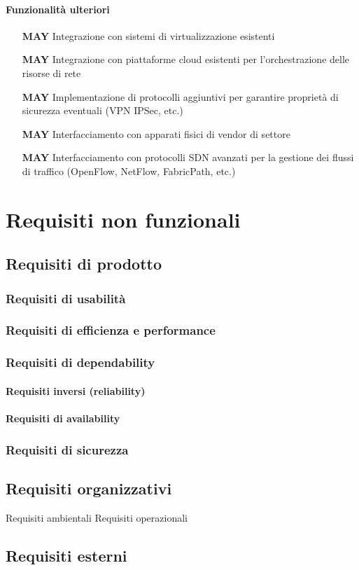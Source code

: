 \documentclass[../main.tex]{subfiles}
\begin{document}
\paragraph{Funzionalità ulteriori}
\begin{itemize}
    \item[\textbf{MAY}] Integrazione con sistemi di virtualizzazione esistenti
    \item[\textbf{MAY}] Integrazione con piattaforme cloud esistenti per l'orchestrazione delle risorse di rete
    \item[\textbf{MAY}] Implementazione di protocolli aggiuntivi per garantire proprietà di sicurezza eventuali (VPN IPSec, etc.)
    \item[\textbf{MAY}] Interfacciamento con apparati fisici di vendor di settore
    \item[\textbf{MAY}] Interfacciamento con protocolli SDN avanzati per la gestione dei flussi di traffico (OpenFlow, NetFlow, FabricPath, etc.)
\end{itemize}

\section{Requisiti non funzionali}
\subsection{Requisiti di prodotto}
\subsubsection{Requisiti di usabilità}
\subsubsection{Requisiti  di  efficienza  e  performance}       
\subsubsection{Requisiti  di  dependability}
\paragraph{Requisiti  inversi  (reliability)}
\paragraph{Requisiti  di  availability}
\subsubsection{Requisiti  di  sicurezza}
\subsection{Requisiti  organizzativi}
Requisiti  ambientali       
Requisiti  operazionali
\subsection{Requisiti esterni}
\end{document}
